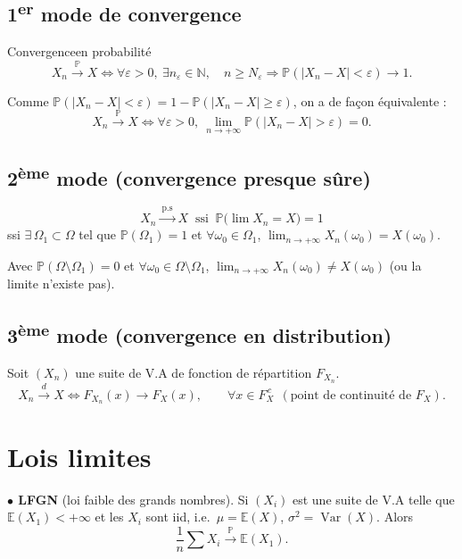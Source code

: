 \documentclass[11pt,a4paper]{article}
\newcommand{\N}{\mathbb{N}}
\newcommand{\PP}{\mathbb{P}}
\newcommand{\EE}{\mathbb{E}}
\DeclareMathOperator{\Var}{Var}
\begin{document}
\subsection*{1\textsuperscript{er} mode de convergence}

\begin{enonce}{Convergence}{en probabilité}
\[
  X_n\xrightarrow{\ \PP\ }X\iff\forall\varepsilon>0,\ \exists n_\varepsilon\in\N,\quad n\ge N_\varepsilon\Rightarrow\PP(|X_n-X|<\varepsilon)\to1 .
\]
\end{enonce}

Comme $\PP(|X_n-X|<\varepsilon)=1-\PP(|X_n-X|\ge\varepsilon)$, on a de façon équivalente :
\[
  X_n\xrightarrow{\ \PP\ }X\iff\forall\varepsilon>0,\ \lim_{n\to+\infty}\PP(|X_n-X|>\varepsilon)=0 .
\]

\subsection*{2\textsuperscript{ème} mode (convergence presque sûre)}

\[
  X_n\xrightarrow{\ \text{p.s}\ }X\ \text{ ssi }\ \PP\bigl(\lim X_n=X\bigr)=1
\]
ssi $\exists\,\Omega_1\subset\Omega$ tel que $\PP(\Omega_1)=1$ et $\forall\omega_0\in\Omega_1$, $\displaystyle\lim_{n\to+\infty}X_n(\omega_0)=X(\omega_0)$.

Avec $\PP(\Omega\setminus\Omega_1)=0$ et $\forall\omega_0\in\Omega\setminus\Omega_1$, $\displaystyle\lim_{n\to+\infty}X_n(\omega_0)\neq X(\omega_0)$ (ou la limite n'existe pas).

\subsection*{3\textsuperscript{ème} mode (convergence en distribution)}

Soit $(X_n)$ une suite de V.A de fonction de répartition $F_{X_n}$.
\[
  X_n\xrightarrow{\ d\ }X\iff F_{X_n}(x)\longrightarrow F_X(x),\qquad\forall x\in F_X^{\,c}\ \ (\text{point de continuité de }F_X).
\]

\section*{Lois limites}

\textbf{\color{bleu}$\bullet$ LFGN} (loi faible des grands nombres). Si $(X_i)$ est une suite de V.A telle que $\EE(X_1)<+\infty$ et les $X_i$ sont iid, i.e.\ $\mu=\EE(X)$, $\sigma^2=\Var(X)$.
Alors
\[
  \frac1n\sum X_i\xrightarrow{\ \PP\ }\EE(X_1).
\]
\end{document}

